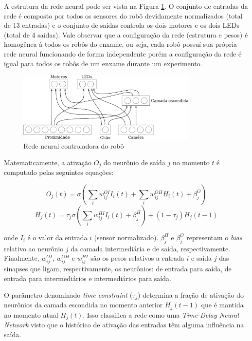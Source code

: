 A estrutura da rede neural pode ser vista na Figura \ref{fig:robot-ann}. O conjunto de entradas da rede é composto por todos os sensores do robô devidamente normalizados (total de 13 entradas) e o conjunto de saídas controla os dois motores e os dois LEDs (total de 4 saídas). Vale observar que a configuração da rede (estrutura e pesos) é homogênea à todos os robôs do enxame, ou seja, cada robô possuí sua própria rede neural funcionando de forma independente porém a configuração da rede é igual para todos os robôs de um enxame durante um experimento.

\begin{figure}[H]
    \centering
    \includegraphics[width=0.8\textwidth]{figures/robot-ann}
    \caption{Rede neural controladora do robô}
    \label{fig:robot-ann}
\end{figure}

Matematicamente, a ativação $O_{j}$ do neurônio de saída $j$ no momento $t$ é computado pelas seguintes equações:

$$
O_{j}(t) = \sigma (\sum_{i} w_{ij}^{OI} I_{i}(t) + \sum_{i} w_{ij}^{OH} H_{i}(t) + \beta_{j}^{O})
$$
$$
H_{j}(t) = \tau_{j} \sigma (\sum_{i} w_{ij}^{HI} I_{i}(t) + \beta_{j}^{H}) + (1 - \tau_{j}) H_{j} (t - 1)
$$

onde $I_{i}$ é o valor da entrada $i$ (sensor normalizado). $\beta_{j}^{H}$ e $\beta_{j}^{O}$  representam o \textit{bias} relativo ao neurônio $j$ da camada intermediária e de saída, respectivamente. Finalmente, $w_{ij}^{OI}$, $w_{ij}^{OH}$ e $w_{ij}^{HI}$ são os pesos relativos a entrada $i$ e saída $j$ das sinapses que ligam, respectivamente, os neurônios: de entrada para saída, de entrada para intermediários e intermediários para saída.

O parâmetro denominado \textit{time constraint} ($\tau_{j}$) determina a fração de ativação do neurônios da camada escondida no momento anterior $H_{j} (t - 1)$ que é mantida no momento atual $H_{j} (t)$. Isso classifica a rede como uma \textit{Time-Delay Neural Network} visto que o histórico de ativação das entradas têm alguma influência na saída.

